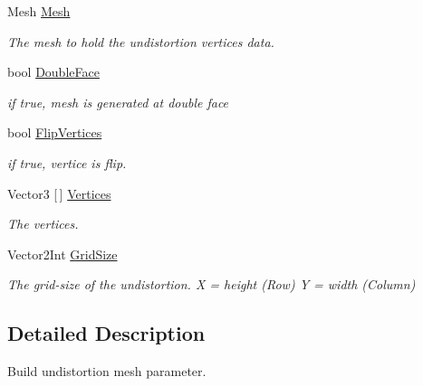 \begin{DoxyCompactItemize}
\item 
Mesh \mbox{\hyperlink{struct_ximmerse_1_1_slide_in_s_d_k_1_1_undistortion_mesh_util_1_1_build_undistortion_mesh_parameter_a798d08d078f76bf744d5861bb0a385be}{Mesh}}
\begin{DoxyCompactList}\small\item\em The mesh to hold the undistortion vertices data. \end{DoxyCompactList}\item 
bool \mbox{\hyperlink{struct_ximmerse_1_1_slide_in_s_d_k_1_1_undistortion_mesh_util_1_1_build_undistortion_mesh_parameter_a9c9bf8eda762f5ef3dd5fc310e77c1d9}{Double\+Face}}
\begin{DoxyCompactList}\small\item\em if true, mesh is generated at double face \end{DoxyCompactList}\item 
bool \mbox{\hyperlink{struct_ximmerse_1_1_slide_in_s_d_k_1_1_undistortion_mesh_util_1_1_build_undistortion_mesh_parameter_ac32c2c1e78c6a9bc2bbf802b4c0d7c99}{Flip\+Vertices}}
\begin{DoxyCompactList}\small\item\em if true, vertice is flip. \end{DoxyCompactList}\item 
Vector3 \mbox{[}$\,$\mbox{]} \mbox{\hyperlink{struct_ximmerse_1_1_slide_in_s_d_k_1_1_undistortion_mesh_util_1_1_build_undistortion_mesh_parameter_abbf449f87fe40129a0d7943967cfd285}{Vertices}}
\begin{DoxyCompactList}\small\item\em The vertices. \end{DoxyCompactList}\item 
Vector2\+Int \mbox{\hyperlink{struct_ximmerse_1_1_slide_in_s_d_k_1_1_undistortion_mesh_util_1_1_build_undistortion_mesh_parameter_a65bafb803476833da8776b9144cf8e44}{Grid\+Size}}
\begin{DoxyCompactList}\small\item\em The grid-\/size of the undistortion. X = height (Row) Y = width (Column) \end{DoxyCompactList}\end{DoxyCompactItemize}


\subsection{Detailed Description}
Build undistortion mesh parameter. 



